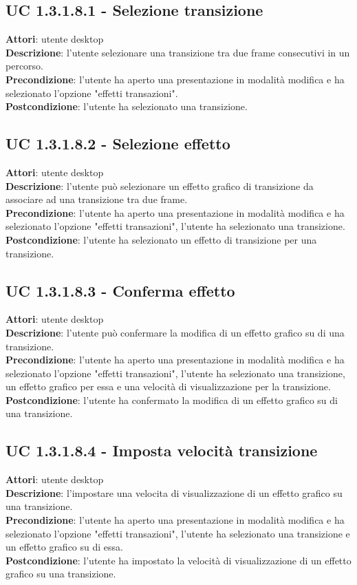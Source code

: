 \subsection{UC 1.3.1.8.1 - Selezione transizione}{
	\label{uc1.3.1..8.1}
	\textbf{Attori}: utente desktop \\
	\textbf{Descrizione}: l'utente selezionare una transizione tra due frame consecutivi in un percorso. \\
	\textbf{Precondizione}: l'utente ha aperto una presentazione in modalità modifica e ha selezionato l'opzione "effetti transazioni".	\\
	\textbf{Postcondizione}: l'utente ha selezionato una transizione.	\\
}
\subsection{UC 1.3.1.8.2 - Selezione effetto}{
	\label{uc1.3.1.8.2}
	\textbf{Attori}: utente desktop \\
	\textbf{Descrizione}: l'utente può selezionare un effetto grafico di transizione da associare ad una transizione tra due frame. \\
	\textbf{Precondizione}: l'utente ha aperto una presentazione in modalità modifica e ha selezionato l'opzione "effetti transazioni", l'utente ha selezionato una transizione.	\\
	\textbf{Postcondizione}: l'utente ha selezionato un effetto di transizione per una transizione.	\\
}
\subsection{UC 1.3.1.8.3 - Conferma effetto}{
	\label{uc1.3.1.8.3}
	\textbf{Attori}: utente desktop \\
	\textbf{Descrizione}: l'utente può confermare la modifica di un effetto grafico su di una transizione. \\
	\textbf{Precondizione}: l'utente ha aperto una presentazione in modalità modifica e ha selezionato l'opzione "effetti transazioni", l'utente ha selezionato una transizione, un effetto grafico per essa e una velocità di visualizzazione per la transizione.	\\
	\textbf{Postcondizione}: l'utente ha confermato la modifica di un effetto grafico su di una transizione.	\\
}
\subsection{UC 1.3.1.8.4 - Imposta velocità transizione}{
	\label{uc1.3.1..8.4}
	\textbf{Attori}: utente desktop \\
	\textbf{Descrizione}: l'impostare una velocita di visualizzazione di un effetto grafico su una transizione. \\
	\textbf{Precondizione}: l'utente ha aperto una presentazione in modalità modifica e ha selezionato l'opzione "effetti transazioni", l'utente ha selezionato una transizione e un effetto grafico su di essa.	\\
	\textbf{Postcondizione}: l'utente ha impostato la velocità di visualizzazione di un effetto grafico su una transizione.	\\
}
